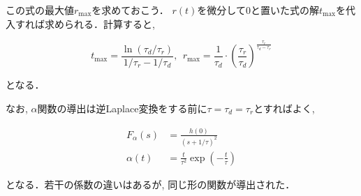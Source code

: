 この式の最大値$r_{\max}$を求めておこう． $r(t)$を微分して0と置いた式の解$t_{\max}$を代入すれば求められる．計算すると, 


\begin{equation}
t_{\max}=\dfrac{\ln(\tau_d/\tau_r)}{1/\tau_r-1/\tau_d},\ \ r_{\max}=\dfrac{1}{\tau_{d}}\cdot \left(\dfrac{\tau_{r}}{\tau_{d}}\right)^{\frac{\tau_{r}}{\tau_d-\tau_{r}}}    
\end{equation}


となる．

なお, $\alpha$関数の導出は逆Laplace変換をする前に$\tau=\tau_d=\tau_r$とすればよく, 


\begin{align}
F_\alpha(s)&=\frac{h(0)}{(s+1/\tau)^2}\\
\alpha(t)&=\frac{t}{\tau^2}\exp\left(-\frac{t}{\tau}\right)
\end{align}

となる．若干の係数の違いはあるが, 同じ形の関数が導出された． 
